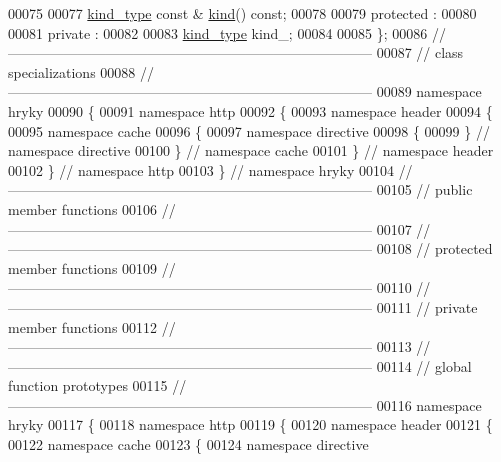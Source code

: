 \begin{DoxyCode}
00075 
00077     \hyperlink{classhryky_1_1_kind}{kind_type} \textcolor{keyword}{const} & \hyperlink{classhryky_1_1http_1_1header_1_1cache_1_1directive_1_1_specifier_a818e55a52b78d9e98cbcaea9d20f8fd3}{kind}() \textcolor{keyword}{const};
00078 
00079 \textcolor{keyword}{protected} :
00080 
00081 \textcolor{keyword}{private} :
00082 
00083     \hyperlink{classhryky_1_1_kind}{kind_type} kind\_;
00084 
00085 \};
00086 \textcolor{comment}{//
      ------------------------------------------------------------------------------}
00087 \textcolor{comment}{// class specializations}
00088 \textcolor{comment}{//
      ------------------------------------------------------------------------------}
00089 \textcolor{keyword}{namespace }hryky
00090 \{
00091 \textcolor{keyword}{namespace }http
00092 \{
00093 \textcolor{keyword}{namespace }header
00094 \{
00095 \textcolor{keyword}{namespace }cache
00096 \{
00097 \textcolor{keyword}{namespace }directive
00098 \{
00099 \} \textcolor{comment}{// namespace directive}
00100 \} \textcolor{comment}{// namespace cache}
00101 \} \textcolor{comment}{// namespace header}
00102 \} \textcolor{comment}{// namespace http}
00103 \} \textcolor{comment}{// namespace hryky}
00104 \textcolor{comment}{//
      ------------------------------------------------------------------------------}
00105 \textcolor{comment}{// public member functions}
00106 \textcolor{comment}{//
      ------------------------------------------------------------------------------}
00107 \textcolor{comment}{//
      ------------------------------------------------------------------------------}
00108 \textcolor{comment}{// protected member functions}
00109 \textcolor{comment}{//
      ------------------------------------------------------------------------------}
00110 \textcolor{comment}{//
      ------------------------------------------------------------------------------}
00111 \textcolor{comment}{// private member functions}
00112 \textcolor{comment}{//
      ------------------------------------------------------------------------------}
00113 \textcolor{comment}{//
      ------------------------------------------------------------------------------}
00114 \textcolor{comment}{// global function prototypes}
00115 \textcolor{comment}{//
      ------------------------------------------------------------------------------}
00116 \textcolor{keyword}{namespace }hryky
00117 \{
00118 \textcolor{keyword}{namespace }http
00119 \{
00120 \textcolor{keyword}{namespace }header
00121 \{
00122 \textcolor{keyword}{namespace }cache
00123 \{
00124 \textcolor{keyword}{namespace }directive

\end{DoxyCode}
